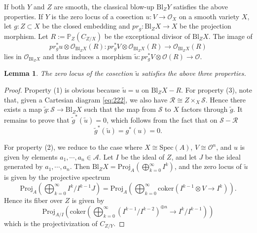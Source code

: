 \documentclass{amsart}
\numberwithin{equation}{section}
\newcommand\mc{\mathcal}
\newcommand{\Bl}{\mathrm{Bl}}
\newtheorem{lemma}[theorem]{Lemma}
\theoremstyle{definition}
\theoremstyle{remark}
\begin{document}
If both $Y$ and $Z$ are smooth, the classical blow-up $\Bl_{Z}Y$ satisfies the above properties. If $Y$ is the zero locus of a cosection $u:V\to \mc{O}_X$ on a smooth variety $X$, let $g:Z\subset X$ be the closed embedding and $pr_g:\Bl_ZX\to X$ be the projection morphism. Let $R:=\mathbb{P}_Z(C_{Z/X})$ be the exceptional divisor of $\Bl_ZX$. The image of 
$$pr_g^*u\otimes \mc{O}_{\Bl_{Z}X}(R):pr_g^*V\otimes \mc{O}_{\Bl_Z{X}}(R)\to \mathcal{O}_{\Bl_{Z}X}(R)$$
 lies in $\mathcal{O}_{\Bl_{Z}X}$ and thus induces a morphism $\tilde{u}:pr_g^*V\otimes \mathcal{O}(R)\to \mathcal{O}$.
 \begin{lemma}
  \label{l27}
  The zero locus of the cosection $\tilde{u}$ satisfies the above three properties. 
 \end{lemma} 
\begin{proof}
  Property (1) is obvious because $\tilde{u}=u$ on $\Bl_{Z}X-R$. For property (3), note that, given a Cartesian diagram \cref{eq:222}, we also have $\mc{R}\cong Z\times_X \mc{S}$. Hence there exists a map $\tilde{g}:\mc{S}\to \Bl_ZX$ such that the map from $\mc{S}$ to $X$ factors through $\tilde{g}$. It remains to prove that $\tilde{g}^*(\tilde{u})=0$, which follows from the fact that on $\mc{S}-\mc{R}$
  \begin{equation*}
    \tilde{g}^*(\tilde{u})=g^*(u)=0.
  \end{equation*}
  

For property (2), we reduce to the case where $X\cong \mathrm{Spec}(A)$, $V\cong \mc{O}^n$, and $u$ is given by elements $a_1,\cdots,a_n\in \mc{A}$. Let $I$ be the ideal of $Z$, and let $J$ be the ideal generated by $a_1,\cdots, a_n$.  Then $\Bl_ZX=\mathrm{Proj}_A(\bigoplus_{k=0}^{\infty}I^k)$, and the zero locus of $\tilde{u}$ is given by the projective spectrum
\begin{equation*}
 \mathrm{Proj}_A(\bigoplus_{k=0}^{\infty}I^k/I^{k-1}J)=\mathrm{Proj}_A(\bigoplus_{k=0}^{\infty}\mathrm{coker}(I^{k-1}\otimes V\to I^k)).
\end{equation*}
Hence its fiber over $Z$ is given by
\begin{equation*}
  \mathrm{Proj}_{A/I}(\mathrm{coker}(\bigoplus_{k=0}^{\infty}(I^{k-1}/I^{k-2})^{\oplus n}\to I^{k}/I^{k-1}))
\end{equation*}
which is the projectivization of $C_{Z/Y}$. 
\end{proof}
\end{document}
